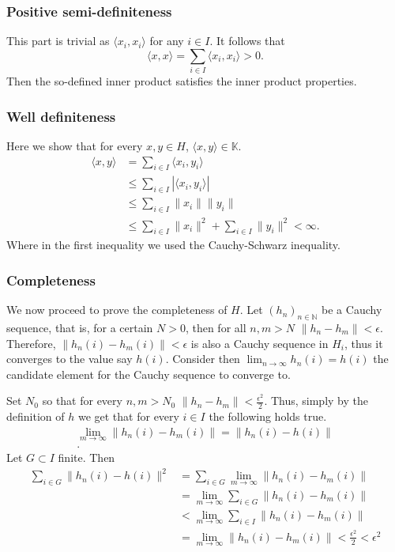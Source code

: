 \documentclass[a4paper,12pt]{article} %
\begin{document}
\subsubsection{Positive semi-definiteness}
This part is trivial as \(\langle x_i,x_i \rangle \) for any \(i \in I\). It follows that
\begin{equation}
    \langle x,x \rangle = \sum_{i \in  I}\langle x_i,x_i \rangle  > 0.
\end{equation}
Then the so-defined inner product satisfies the inner product properties.

\subsubsection{Well definiteness}
Here we show that for every \(x,y \in  H\), \(\langle x,y \rangle \in  \mathbb{K}\).
\begin{align*}
    \langle x,y \rangle & = \sum_{i \in  I}\langle x_i, y_i \rangle       \\
                        & \leq  \sum_{i \in  I}|\langle x_i,y_i \rangle | \\
                        & \leq \sum_{i \in I}\| x_i \|\| y_i \|           \\ &\leq \sum_{i \in  I} \| x_i \|^{2} + \sum_{i \in  I}\| y_i \|^{2} < \infty.
\end{align*}
Where in the first inequality we used the Cauchy-Schwarz inequality.
\subsubsection{Completeness}
We now proceed to prove the completeness of \(H\).
Let \((h_n)_{n \in  \mathbb{N}}\) be a Cauchy sequence, that is, for a certain \(N>0\), then for all \(n,m>N\) \(\| h_n - h_m \| <\epsilon \). Therefore, \(\| h_n(i) - h_m(i) \|<\epsilon  \) is also a Cauchy sequence in \(H_i\), thus it converges to the value say \(h(i)\). Consider then \(\lim_{n \to \infty}h_n(i) = h(i) \) the candidate element for the Cauchy sequence to converge to.

Set \(N_0\) so that for every \(n,m >N_0\) \(\| h_n -h_m\|< \frac{\epsilon^2}{2} \). Thus, simply by the definition of \(h\) we get that for every \(i \in  I\) the following holds true.
\begin{align*}
    \lim_{m \to \infty}\| h_n(i) - h_m(i) \| = \| h_{n}(i)-h(i)  \| \\.
\end{align*}
Let \(G \subset I\) finite. Then
\begin{align*}
    \sum_{i \in  G}\| h_n(i)- h(i) \|^{2} & = \sum_{i \in  G} \lim_{m \to \infty} \| h_n(i) -h_m(i)\|                      \\
                                          & = \lim_{m \to \infty} \sum_{i \in  G} \| h_n(i) -h_m(i)\|                      \\
                                          & < \lim_{m \to \infty} \sum_{i \in  I} \| h_n(i) -h_m(i)\|                      \\
                                          & = \lim_{m \to \infty} \| h_n(i) - h_m(i)\| <\frac{\epsilon^2}{2}  < \epsilon^2
\end{align*}
\end{document}
